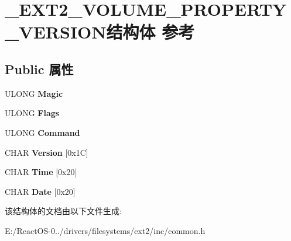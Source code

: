 \hypertarget{struct___e_x_t2___v_o_l_u_m_e___p_r_o_p_e_r_t_y___v_e_r_s_i_o_n}{}\section{\+\_\+\+E\+X\+T2\+\_\+\+V\+O\+L\+U\+M\+E\+\_\+\+P\+R\+O\+P\+E\+R\+T\+Y\+\_\+\+V\+E\+R\+S\+I\+O\+N结构体 参考}
\label{struct___e_x_t2___v_o_l_u_m_e___p_r_o_p_e_r_t_y___v_e_r_s_i_o_n}
\subsection*{Public 属性}
\begin{DoxyCompactItemize}
\item 
\mbox{\label{struct___e_x_t2___v_o_l_u_m_e___p_r_o_p_e_r_t_y___v_e_r_s_i_o_n_adef6f76b8f71da6d48d971214fefc3fe}} 
U\+L\+O\+NG {\bfseries Magic}
\item 
\mbox{\label{struct___e_x_t2___v_o_l_u_m_e___p_r_o_p_e_r_t_y___v_e_r_s_i_o_n_a4d90f1ce570022eb431de3a09e07fa4a}} 
U\+L\+O\+NG {\bfseries Flags}
\item 
\mbox{\label{struct___e_x_t2___v_o_l_u_m_e___p_r_o_p_e_r_t_y___v_e_r_s_i_o_n_ab96cd781a699d94b73fc59b2e003434d}} 
U\+L\+O\+NG {\bfseries Command}
\item 
\mbox{\label{struct___e_x_t2___v_o_l_u_m_e___p_r_o_p_e_r_t_y___v_e_r_s_i_o_n_ae5f9eb20b8e18e14959080b90c2dcd8a}} 
C\+H\+AR {\bfseries Version} \mbox{[}0x1\+C\mbox{]}
\item 
\mbox{\label{struct___e_x_t2___v_o_l_u_m_e___p_r_o_p_e_r_t_y___v_e_r_s_i_o_n_a67a9ad50311766a480db5d627c341c79}} 
C\+H\+AR {\bfseries Time} \mbox{[}0x20\mbox{]}
\item 
\mbox{\label{struct___e_x_t2___v_o_l_u_m_e___p_r_o_p_e_r_t_y___v_e_r_s_i_o_n_a42ec1a015dae888c2a3868c64506940e}} 
C\+H\+AR {\bfseries Date} \mbox{[}0x20\mbox{]}
\end{DoxyCompactItemize}


该结构体的文档由以下文件生成\+:\begin{DoxyCompactItemize}
\item 
E\+:/\+React\+O\+S-\/0../drivers/filesystems/ext2/inc/common.\+h\end{DoxyCompactItemize}
